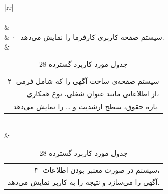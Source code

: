 \documentclass[12pt]{article}
\begin{document}
\begin{center}
	\begin{table}[]
		\caption{جدول مورد کاربرد گسترده 28}
		\label{tab:ext-uc28}
		\begin{tabular}{|rr|}
			\hline
			                                                                                                                                                                                                                                                 \\ \hline
			                                                                                                                                                                                                                                   \\ \hline
			                                                                                          &                                                                                                                              \\ \hline
			                                                                                                        & ۰- سیستم صفحه کاربری کارفرما را نمایش می‌دهد.                                                                                                                                \\ \hline
			 & \begin{tabular}[c]{@{}r@{}}۲- سیستم صفحه‌ی ساخت آگهی را که شامل فرمی \\ از اطلاعاتی مانند عنوان شغلی، نوع همکاری، \\ بازه حقوق، سطح ارشدیت و … را نمایش می‌دهد.\end{tabular} \\ \hline
			 & \begin{tabular}[c]{@{}r@{}}۴- سیستم در صورت معتبر بودن اطلاعات، \\ آگهی را می‌سازد و نتیجه را به کاربر نمایش می‌دهد.\end{tabular}                                            \\ \hline

\end{tabular}
\end{table}
\end{center}
\end{document}
